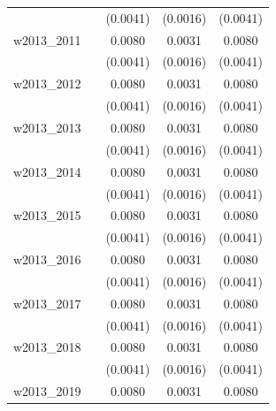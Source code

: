 \begin{table}[htbp]
\begin{tabular}{l*{4}{c}}
            &                     &    (0.0041)         &    (0.0016)         &    (0.0041)         \\
[1em]
w2013\_2011  &                     &      0.0080\sym{**} &      0.0031\sym{**} &      0.0080\sym{**} \\
            &                     &    (0.0041)         &    (0.0016)         &    (0.0041)         \\
[1em]
w2013\_2012  &                     &      0.0080\sym{**} &      0.0031\sym{**} &      0.0080\sym{**} \\
            &                     &    (0.0041)         &    (0.0016)         &    (0.0041)         \\
[1em]
w2013\_2013  &                     &      0.0080\sym{**} &      0.0031\sym{**} &      0.0080\sym{**} \\
            &                     &    (0.0041)         &    (0.0016)         &    (0.0041)         \\
[1em]
w2013\_2014  &                     &      0.0080\sym{**} &      0.0031\sym{**} &      0.0080\sym{**} \\
            &                     &    (0.0041)         &    (0.0016)         &    (0.0041)         \\
[1em]
w2013\_2015  &                     &      0.0080\sym{**} &      0.0031\sym{**} &      0.0080\sym{**} \\
            &                     &    (0.0041)         &    (0.0016)         &    (0.0041)         \\
[1em]
w2013\_2016  &                     &      0.0080\sym{**} &      0.0031\sym{**} &      0.0080\sym{**} \\
            &                     &    (0.0041)         &    (0.0016)         &    (0.0041)         \\
[1em]
w2013\_2017  &                     &      0.0080\sym{**} &      0.0031\sym{**} &      0.0080\sym{**} \\
            &                     &    (0.0041)         &    (0.0016)         &    (0.0041)         \\
[1em]
w2013\_2018  &                     &      0.0080\sym{**} &      0.0031\sym{**} &      0.0080\sym{**} \\
            &                     &    (0.0041)         &    (0.0016)         &    (0.0041)         \\
[1em]
w2013\_2019  &                     &      0.0080\sym{**} &      0.0031\sym{**} &      0.0080\sym{**} \\

\end{tabular}
\end{table}
